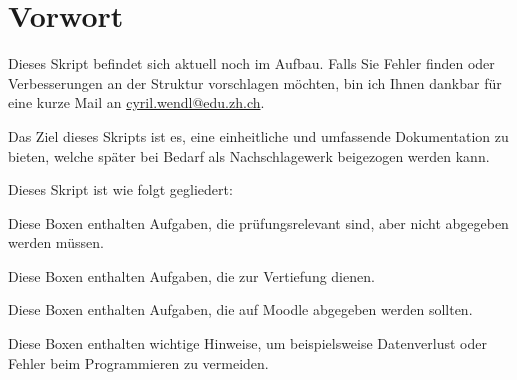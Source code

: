 \chapter{Vorwort}
Dieses Skript befindet sich aktuell noch im Aufbau. Falls Sie Fehler finden oder Verbesserungen an der Struktur vorschlagen möchten, bin ich Ihnen dankbar für eine kurze Mail an \url{cyril.wendl@edu.zh.ch}.

Das Ziel dieses Skripts ist es, eine einheitliche und umfassende Dokumentation zu bieten, welche später bei Bedarf als Nachschlagewerk beigezogen werden kann.

Dieses Skript ist wie folgt gegliedert:

\begin{aufgabe}{}
Diese Boxen enthalten Aufgaben, die prüfungsrelevant sind, aber nicht abgegeben werden müssen.
\end{aufgabe}

\begin{mychallenge}
Diese Boxen enthalten Aufgaben, die zur Vertiefung dienen.
\end{mychallenge}

\begin{myabgabe}
Diese Boxen enthalten Aufgaben, die auf Moodle abgegeben werden sollten.
\end{myabgabe}

\begin{myachtung}
Diese Boxen enthalten wichtige Hinweise, um beispielsweise Datenverlust oder Fehler beim Programmieren zu vermeiden.
\end{myachtung}